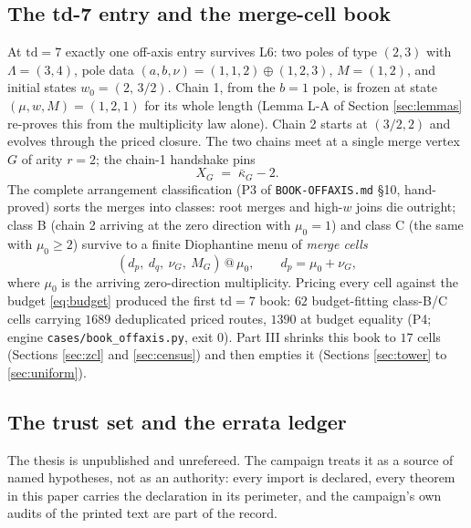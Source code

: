 \documentclass[11pt]{article}
\theoremstyle{definition}
\theoremstyle{remark}
\newcommand{\kb}{\bar\kappa}
\begin{document}
\subsection{The td-7 entry and the merge-cell book}\label{sec:td7entry}

At $\mathrm{td}=7$ exactly one off-axis entry survives L6: two poles of type $(2,3)$ with $\Lambda=(3,4)$, pole data $(a,b,\nu)=(1,1,2)\oplus(1,2,3)$, $M=(1,2)$, and initial states $w_0=(2,\,3/2)$. Chain 1, from the $b=1$ pole, is frozen at state $(\mu,w,M)=(1,2,1)$ for its whole length (Lemma L-A of Section \ref{sec:lemmas} re-proves this from the multiplicity law alone). Chain 2 starts at $(3/2,2)$ and evolves through the priced closure. The two chains meet at a single merge vertex $G$ of arity $r=2$; the chain-1 handshake pins
\begin{equation}\label{eq:I3}
X_G\;=\;\kb_G-2.
\end{equation}
The complete arrangement classification (P3 of \texttt{BOOK-OFFAXIS.md} \S10, hand-proved) sorts the merges into classes: root merges and high-$w$ joins die outright; class B (chain 2 arriving at the zero direction with $\mu_0=1$) and class C (the same with $\mu_0\geq 2$) survive to a finite Diophantine menu of \emph{merge cells}
\[
(d_p,\ d_q,\ \nu_G,\ M_G)\,@\,\mu_0,\qquad d_p=\mu_0+\nu_G,
\]
where $\mu_0$ is the arriving zero-direction multiplicity. Pricing every cell against the budget \eqref{eq:budget} produced the first $\mathrm{td}=7$ book: $62$ budget-fitting class-B/C cells carrying $1689$ deduplicated priced routes, $1390$ at budget equality (P4; engine \texttt{cases/book\_offaxis.py}, exit 0). Part III shrinks this book to $17$ cells (Sections \ref{sec:zcl} and \ref{sec:census}) and then empties it (Sections \ref{sec:tower} to \ref{sec:uniform}).

\subsection{The trust set and the errata ledger}\label{sec:trust}

The thesis \cite{Sigray} is unpublished and unrefereed. The campaign treats it as a source of named hypotheses, not as an authority: every import is declared, every theorem in this paper carries the declaration in its perimeter, and the campaign's own audits of the printed text are part of the record.
\end{document}
